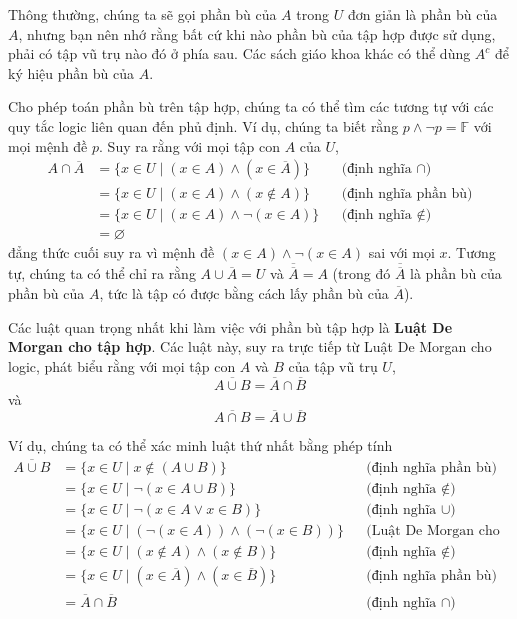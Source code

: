 Thông thường, chúng ta sẽ gọi phần bù của $A$ trong $U$ đơn giản là phần bù của $A$, nhưng bạn nên nhớ rằng bất cứ khi nào phần bù của tập hợp được sử dụng, phải có tập vũ trụ nào đó ở phía sau. Các sách giáo khoa khác có thể dùng $A^c$ để ký hiệu phần bù của $A$.

Cho phép toán phần bù trên tập hợp, chúng ta có thể tìm các tương tự với các quy tắc logic liên quan đến phủ định. Ví dụ, chúng ta biết rằng $p \land \neg p = \mathbb{F}$ với mọi mệnh đề $p$. Suy ra rằng với mọi tập con $A$ của $U$,
\begin{align*}
A \cap \overline{A} &= \{x \in U \mid (x \in A) \land (x \in \overline{A})\} & &\text{(định nghĩa } \cap\text{)} \\
&= \{x \in U \mid (x \in A) \land (x \notin A)\} & &\text{(định nghĩa phần bù)} \\
&= \{x \in U \mid (x \in A) \land \neg(x \in A)\} & &\text{(định nghĩa } \notin\text{)} \\
&= \varnothing
\end{align*}
đẳng thức cuối suy ra vì mệnh đề $(x \in A) \land \neg(x \in A)$ sai với mọi $x$. Tương tự, chúng ta có thể chỉ ra rằng $A \cup \overline{A} = U$ và $\overline{\overline{A}} = A$ (trong đó $\overline{\overline{A}}$ là phần bù của phần bù của $A$, tức là tập có được bằng cách lấy phần bù của $\overline{A}$).

Các luật quan trọng nhất khi làm việc với phần bù tập hợp là \textbf{Luật De Morgan cho tập hợp}. Các luật này, suy ra trực tiếp từ Luật De Morgan cho logic, phát biểu rằng với mọi tập con $A$ và $B$ của tập vũ trụ $U$,
\[
\overline{A \cup B} = \overline{A} \cap \overline{B}
\]
và
\[
\overline{A \cap B} = \overline{A} \cup \overline{B}
\]

Ví dụ, chúng ta có thể xác minh luật thứ nhất bằng phép tính
\begin{align*}
\overline{A \cup B} &= \{x \in U \mid x \notin (A \cup B)\} & &\text{(định nghĩa phần bù)} \\
&= \{x \in U \mid \neg(x \in A \cup B)\} & &\text{(định nghĩa } \notin\text{)} \\
&= \{x \in U \mid \neg(x \in A \lor x \in B)\} & &\text{(định nghĩa } \cup\text{)} \\
&= \{x \in U \mid (\neg(x \in A)) \land (\neg(x \in B))\} & &\text{(Luật De Morgan cho logic)} \\
&= \{x \in U \mid (x \notin A) \land (x \notin B)\} & &\text{(định nghĩa } \notin\text{)} \\
&= \{x \in U \mid (x \in \overline{A}) \land (x \in \overline{B})\} & &\text{(định nghĩa phần bù)} \\
&= \overline{A} \cap \overline{B} & &\text{(định nghĩa } \cap\text{)}
\end{align*}

